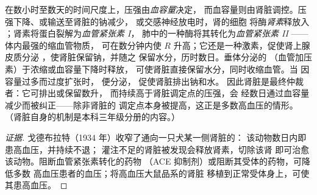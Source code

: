 \begin{proposition}\label{prop:b2:blood-pressure:raas}
在数小时至数天的时间尺度上，压强由\emph{血容量}决定，
而血容量则由肾脏调控。压强下降、或输送至肾脏的钠减少，
或交感神经放电时，肾的细胞
将酶\emph{肾素}释放入
；肾素将蛋白裂解为\emph{血管紧张素 I}，
肺中的一种酶将其转化为\emph{血管紧张素 II}
——体内最强的缩血管物质，
可在数分钟内使 $R$ 升高；它还是一种激素，促使肾上腺皮质分泌
\emph{}，使肾脏保留钠，并随之
保留水分，历时数日。垂体分泌的
\emph{}（血管加压素）于浓缩或血容量下降时释放，
可使肾脏直接保留水分，同时收缩血管。当
因容量过多而过度扩张时，
便分泌\emph{}，
促使肾脏排出钠和水。
因此肾脏是最终仲裁者：它可排出或保留数升，
而持续高于肾脏调定点的压强，会
经数日通过血容量减少而被纠正——除非肾脏的
调定点本身被提高，这正是多数高血压的情形。
（肾脏自身的机制是本科三年级分册的内容。）
\end{proposition}
\begin{proof}[证据]
戈德布拉特（1934 年）收窄了通向一只犬某一侧肾脏的：
该动物数日内即患高血压，并持续不退；
灌注不足的肾脏被发现会释放肾素，切除该肾
即可治愈该动物。阻断血管紧张素转化的药物
（ACE 抑制剂）或阻断其受体的药物，可降低多数
高血压患者的血压；将高血压大鼠品系的肾脏
移植到正常受体身上，可使其患高血压。
\end{proof}

